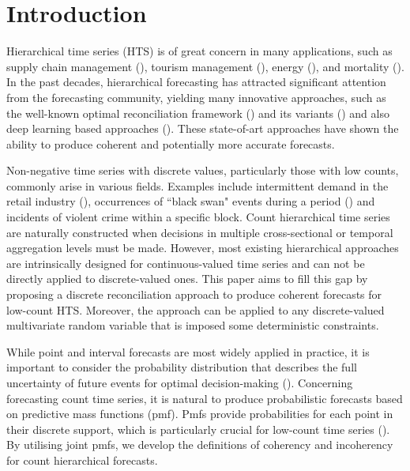 \documentclass[a4paper,review,12pt,authoryear]{elsarticle}
\begin{document}
\section{Introduction}

Hierarchical time series (HTS) is of great concern in many applications, such as supply chain management (\citealp{babaiDemandForecastingSupply2022}), tourism management (\citealp{kourentzesCrosstemporalCoherentForecasts2019}), energy (\citealp{nystrupTemporalHierarchiesAutocorrelation2020}), and mortality (\citealp{liHierarchicalMortalityForecasting2022}).
In the past decades, hierarchical forecasting has attracted significant attention from the forecasting community, yielding many innovative approaches, such as the well-known optimal reconciliation framework (\citealp{hyndmanOptimalCombinationForecasts2011, wickramasuriyaOptimalForecastReconciliation2019, panagiotelisProbabilisticForecastReconciliation2022}) and its variants () and also deep learning based approaches (\citealp{rangapuramEndtoEndLearningCoherent2021}).
These state-of-art approaches have shown the ability to produce coherent and potentially more accurate forecasts.

Non-negative time series with discrete values, particularly those with low counts, commonly arise in various fields.
Examples include intermittent demand in the retail industry (\citealp{kourentzesElucidateStructureIntermittent2021}), occurrences of ``black swan" events during a period (\citealp{nikolopoulosWeNeedTalk2020}) and incidents of violent crime within a specific block.
Count hierarchical time series are naturally constructed when decisions in multiple cross-sectional or temporal aggregation levels must be made.
However, most existing hierarchical approaches are intrinsically designed for continuous-valued time series and can not be directly applied to discrete-valued ones.
This paper aims to fill this gap by proposing a discrete reconciliation approach to produce coherent forecasts for low-count HTS.
Moreover, the approach can be applied to any discrete-valued multivariate random variable that is imposed some deterministic constraints.


While point and interval forecasts are most widely applied in practice, it is important to consider the probability distribution that describes the full uncertainty of future events for optimal decision-making (\citealp{gneitingProbabilisticForecasting2014}).
Concerning forecasting count time series, it is natural to produce probabilistic forecasts based on predictive mass functions (pmf).
Pmfs provide probabilities for each point in their discrete support,
which is particularly crucial for low-count time series (\citealp{petropoulosForecastingTheoryPractice2022a}).
By utilising joint pmfs, we develop the definitions of coherency and incoherency for count hierarchical forecasts.
\end{document}
